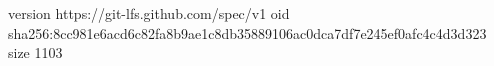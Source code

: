 version https://git-lfs.github.com/spec/v1
oid sha256:8cc981e6acd6c82fa8b9ae1c8db35889106ac0dca7df7e245ef0afc4c4d3d323
size 1103
